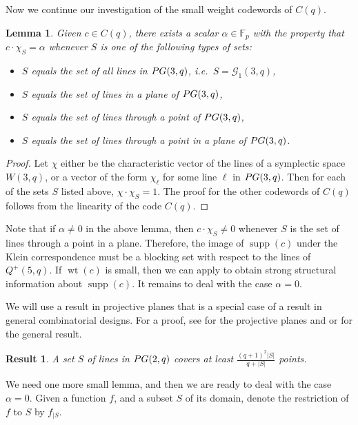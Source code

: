 \documentclass[a4paper]{article}
\newtheorem{lm}[thm]{Lemma}
\newtheorem{res}[thm]{Result}
\theoremstyle{definition}
\newcommand{\FF}{\mathbb F}
\newcommand{\pg}{\textnormal{PG}}
\newcommand{\mg}{\mathcal G}
\DeclareMathOperator{\supp}{supp}
\DeclareMathOperator{\wt}{wt}
\begin{document}
Now we continue our investigation of the small weight codewords of $C(q)$.

\begin{lm}
 \label{Lm:Inprod}
 Given $c \in C(q)$, there exists a scalar $\alpha \in \FF_p$ with the property that $c \cdot \chi_S = \alpha$ whenever $S$ is one of the following types of sets:
 \begin{itemize}
     \item $S$ equals the set of all lines in $\pg(3,q)$, i.e.\ $S = \mg_1(3,q)$,
     \item $S$ equals the set of lines in a plane of $\pg(3,q)$,
     \item $S$ equals the set of lines through a point of $\pg(3,q)$,
     \item $S$ equals the set of lines through a point in a plane of $\pg(3,q)$.
 \end{itemize}
\end{lm}

\begin{proof}
 Let $\chi$ either be the characteristic vector of the lines of a symplectic space $W(3,q)$, or a vector of the form $\chi_\ell$ for some line $\ell$ in $\pg(3,q)$.
 Then for each of the sets $S$ listed above, $\chi \cdot \chi_S = 1$.
 The proof for the other codewords of $C(q)$ follows from the  linearity of the code $C(q)$.
\end{proof}

Note that if $\alpha \neq 0$ in the above lemma, then $c \cdot \chi_S \neq 0$ whenever $S$ is the set of lines through a point in a plane.
Therefore, the image of $\supp(c)$ under the Klein correspondence must be a blocking set with respect to the lines of $Q^+(5,q)$.
If $\wt(c)$ is small, then we can apply  to obtain strong structural information about $\supp(c)$.
It remains to deal with the case $\alpha = 0$.

We will use a result in projective planes that is a special case of a result in general combinatorial designs.
For a proof, see \cite[Theorem 3.1]{stinson} for the projective planes and \cite[Theorem 4.1]{stinson} or \cite[Corollary 5.3]{haemers} for the general result.

\begin{res}
 \label{Res:EdgeDom}
 A set $S$ of lines in $\pg(2,q)$ covers at least $\frac{(q+1)^2|S|}{q+|S|}$ points.
\end{res}

We need one more small lemma, and then we are ready to deal with the case $\alpha = 0$.
Given a function $f$, and a subset $S$ of its domain, denote the restriction of $f$ to $S$ by $f_{|S}$.
\end{document}
